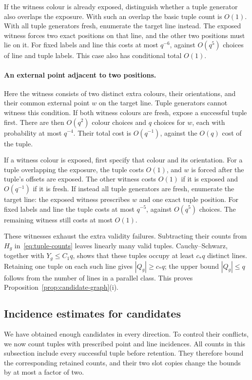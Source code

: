 If the witness colour is already exposed, distinguish whether a tuple
generator also overlaps the exposure. With such an overlap the basic
tuple count is $O(1)$. With all tuple generators fresh, enumerate the
target line instead. The exposed witness forces two exact positions on
that line, and the other two positions must lie on it. For fixed labels
and line this costs at most $q^{-6}$, against $O(q^5)$ choices of line
and tuple labels. This case also has conditional total $O(1)$.

\paragraph{An external point adjacent to two positions.}
Here the witness consists of two distinct extra colours, their
orientations, and their common external point $w$ on the target line.
Tuple generators cannot witness this condition. If both witness colours
are fresh, expose a successful tuple first. There are then $O(q^2)$
colour choices and $q$ choices for $w$, each with probability at most
$q^{-4}$. Their total cost is $O(q^{-1})$, against the $O(q)$ cost
of the tuple.

If a witness colour is exposed, first specify that colour and its
orientation. For a tuple overlapping the exposure, the tuple costs
$O(1)$, and $w$ is forced after the tuple's offsets are exposed. The
other witness costs $O(1)$ if it is exposed and $O(q^{-1})$ if it is
fresh. If instead all tuple generators are fresh, enumerate the target
line: the exposed witness prescribes $w$ and one exact tuple position.
For fixed labels and line the tuple costs at most $q^{-5}$, against
$O(q^5)$ choices. The remaining witness still costs at most $O(1)$.

These witnesses exhaust the extra validity failures. Subtracting their
counts from $H_g$ in~\eqref{eq:tuple-counts} leaves linearly many valid
tuples. Cauchy--Schwarz, together with $Y_g\le C_1q$, shows that these
tuples occupy at least $c_*q$ distinct lines. Retaining one tuple on
each such line gives $|Q_g|\ge c_*q$; the upper bound $|Q_g|\le q$
follows from the number of lines in a parallel class. This proves
Proposition~\ref{prop:candidate-graph}(i).

\subsection{Incidence estimates for candidates}

We have obtained enough candidates in every direction. To control their
conflicts, we now count tuples with prescribed point and line incidences.
All counts in this subsection include every successful tuple before
retention. They therefore bound the corresponding retained counts, and
their two slot copies change the bounds by at most a factor of two.

